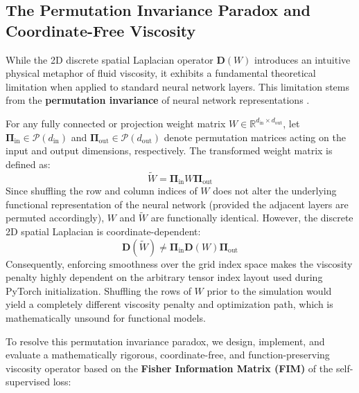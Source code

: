 \subsection{The Permutation Invariance Paradox and Coordinate-Free Viscosity}
\label{subsec:permutation_invariance}

While the 2D discrete spatial Laplacian operator $\mathbf{D}(W)$ introduces an intuitive physical metaphor of fluid viscosity, it exhibits a fundamental theoretical limitation when applied to standard neural network layers. This limitation stems from the \textbf{permutation invariance} of neural network representations \cite{ainsworth2022git}.

For any fully connected or projection weight matrix $W \in \mathbb{R}^{d_{\text{in}} \times d_{\text{out}}}$, let $\mathbf{\Pi}_{\text{in}} \in \mathcal{P}(d_{\text{in}})$ and $\mathbf{\Pi}_{\text{out}} \in \mathcal{P}(d_{\text{out}})$ denote permutation matrices acting on the input and output dimensions, respectively. The transformed weight matrix is defined as:
\begin{equation}
    \tilde{W} = \mathbf{\Pi}_{\text{in}} W \mathbf{\Pi}_{\text{out}}
\end{equation}
Since shuffling the row and column indices of $W$ does not alter the underlying functional representation of the neural network (provided the adjacent layers are permuted accordingly), $W$ and $\tilde{W}$ are functionally identical. However, the discrete 2D spatial Laplacian is coordinate-dependent:
\begin{equation}
    \mathbf{D}(\tilde{W}) \neq \mathbf{\Pi}_{\text{in}} \mathbf{D}(W) \mathbf{\Pi}_{\text{out}}
\end{equation}
Consequently, enforcing smoothness over the grid index space makes the viscosity penalty highly dependent on the arbitrary tensor index layout used during PyTorch initialization. Shuffling the rows of $W$ prior to the simulation would yield a completely different viscosity penalty and optimization path, which is mathematically unsound for functional models.

To resolve this permutation invariance paradox, we design, implement, and evaluate a mathematically rigorous, coordinate-free, and function-preserving viscosity operator based on the \textbf{Fisher Information Matrix (FIM)} of the self-supervised loss:

